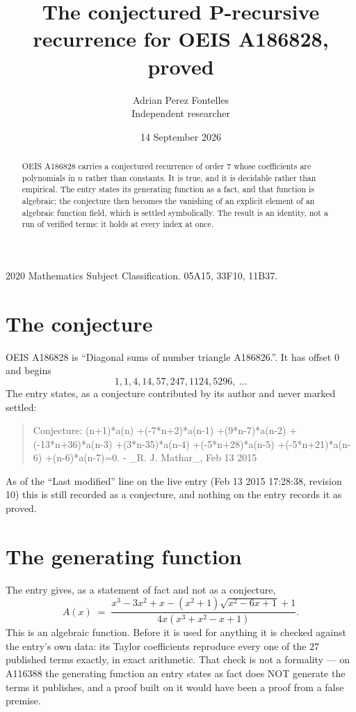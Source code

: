 \documentclass[11pt,a4paper]{article}
\title{The conjectured P-recursive recurrence for OEIS A186828, proved}
\author{Adrian Perez Fontelles\\ \small Independent researcher}
\date{14 September 2026}
\theoremstyle{plain}
\theoremstyle{definition}
\begin{document}
\maketitle

\begin{abstract}
OEIS A186828 carries a conjectured recurrence of order $7$ whose coefficients are polynomials in
$n$ rather than constants. It is true, and it is decidable rather than empirical. The entry
states its generating function as a fact, and that function is algebraic; the conjecture then
becomes the vanishing of an explicit element of an algebraic function field, which is settled
symbolically. The result is an identity, not a run of verified terms: it holds at every index
at once.
\end{abstract}

\noindent\small 2020 Mathematics Subject Classification. 05A15, 33F10, 11B37.\normalsize

\section{The conjecture}

OEIS A186828 is ``Diagonal sums of number triangle A186826.''. It has offset $0$ and begins
\[
1, 1, 4, 14, 57, 247, 1124, 5296,\ \dots
\]
The entry states, as a conjecture contributed by its author and never marked settled:
\begin{quote}\raggedright\small
Conjecture: (n+1)*a(n) +(-7*n+2)*a(n-1) +(9*n-7)*a(n-2) +(-13*n+36)*a(n-3) +(3*n-35)*a(n-4) +(-5*n+28)*a(n-5) +(-5*n+21)*a(n-6) +(n-6)*a(n-7)=0. - \_R. J. Mathar\_, Feb 13 2015
\end{quote}
As of the ``Last modified'' line on the live entry (Feb 13 2015 17:28:38, revision 10)
this is still recorded as a conjecture, and nothing on the entry records it as proved.

\section{The generating function}

The entry gives, as a statement of fact and not as a conjecture,
\[
A(x)\;=\;\frac{x^{3} - 3 x^{2} + x - \left(x^{2} + 1\right) \sqrt{x^{2} - 6 x + 1} + 1}{4 x \left(x^{3} + x^{2} - x + 1\right)} .
\]
This is an algebraic function. Before it is used for anything it is checked against the entry's
own data: its Taylor coefficients reproduce every one of the $27$ published terms
exactly, in exact arithmetic. That check is not a formality --- on A116388 the generating
function an entry states as fact does NOT generate the terms it publishes, and a proof built on
it would have been a proof from a false premise.
\end{document}
